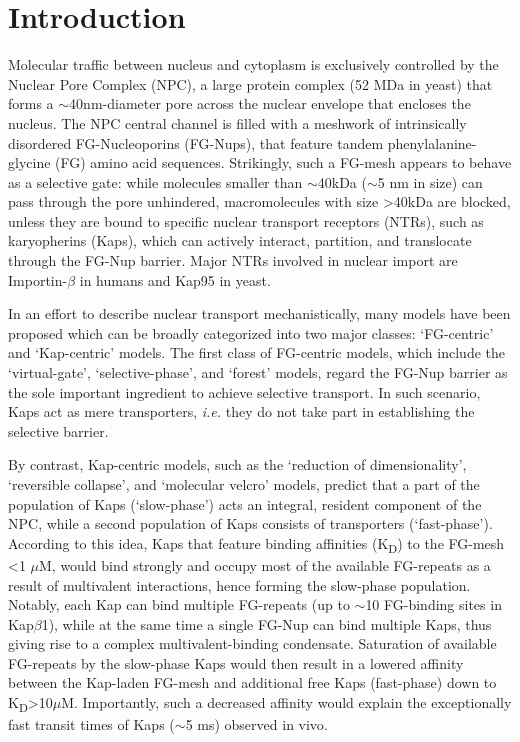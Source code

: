 \section{Introduction}
Molecular traffic between nucleus and cytoplasm is exclusively controlled by the Nuclear Pore Complex (NPC), a large protein complex (52 MDa in yeast\cite{Kim2018}) that forms a $\sim$40nm-diameter pore across the nuclear envelope that encloses the nucleus\cite{Veenhoff2007,Wente2000}. The NPC central channel is filled with a meshwork of intrinsically disordered FG-Nucleoporins (FG-Nups), that feature tandem phenylalanine-glycine (FG) amino acid sequences\cite{Terry2009,Yamada2010}. Strikingly, such a FG-mesh appears to behave as a selective gate\cite{Terry2009}: while molecules smaller than $\sim$40kDa ($\sim$5 nm in size) can pass through the pore unhindered, macromolecules with size >40kDa are blocked, unless they are bound to specific nuclear transport receptors (NTRs), such as karyopherins (Kaps), which can actively interact, partition, and translocate through the FG-Nup barrier. Major NTRs involved in nuclear import are Importin-$\beta$ in humans and Kap95 in yeast\cite{Stewart2007}.

In an effort to describe nuclear transport mechanistically, many models have been proposed\cite{David2014,Lim2015} which can be broadly categorized into two major classes: ‘FG-centric’ and ‘Kap-centric’ models. The first class of FG-centric models, which include the ‘virtual-gate’\cite{Rout2003}, ‘selective-phase’\cite{Frey2006,Frey2007}, and ‘forest’\cite{Yamada2010} models, regard the FG-Nup barrier as the sole important ingredient to achieve selective transport. In such scenario, Kaps act as mere transporters, \emph{i.e.} they do not take part in establishing the selective barrier.

By contrast, Kap-centric models\cite{Kapinos2014}, such as the ‘reduction of dimensionality’\cite{Peters2005}, ‘reversible collapse’\cite{Lim2007}, and ‘molecular velcro’\cite{Schleicher2014} models, predict that a part of the population of Kaps (‘slow-phase’) acts an integral, resident component of the NPC\cite{Kapinos2014,Kapinos2017}, while a second population of Kaps consists of transporters (‘fast-phase’). According to this idea\cite{Lim2015}, Kaps that feature binding affinities (K\textsubscript{D}) to the FG-mesh <1 $\mu$M, would bind strongly and occupy most of the available FG-repeats as a result of multivalent interactions, hence forming the slow-phase population. Notably, each Kap can bind multiple FG-repeats (up to $\sim$10 FG-binding sites in Kap$\beta$1\cite{Bayliss2000}), while at the same time a single FG-Nup can bind multiple Kaps, thus giving rise to a complex multivalent-binding condensate. Saturation of available FG-repeats by the slow-phase Kaps would then result in a lowered affinity between the Kap-laden FG-mesh and additional free Kaps (fast-phase) down to K\textsubscript{D}>10$\mu$M. Importantly, such a decreased affinity would explain the exceptionally fast transit times of Kaps ($\sim$5 ms) observed in vivo\cite{Dange2008}.


